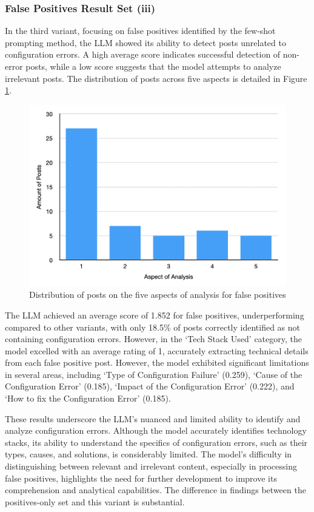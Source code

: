 \documentclass[english,bachelor]{swsLeipzig}
\begin{document}
\subsubsection{False Positives Result Set (iii)}

In the third variant, focusing on false positives identified by the few-shot prompting method, the LLM showed its ability to detect posts unrelated to configuration errors. A high average score indicates successful detection of non-error posts, while a low score suggests that the model attempts to analyze irrelevant posts. The distribution of posts across five aspects is detailed in Figure \ref{fig:appendix5}.

\begin{figure}[h]
  \centering
  \includegraphics[width=1\textwidth]{images/table_setC.png}
  \caption{Distribution of posts on the five aspects of analysis for false positives}
  \label{fig:appendix5}
\end{figure}

The LLM achieved an average score of 1.852 for false positives, underperforming compared to other variants, with only 18.5\% of posts correctly identified as not containing configuration errors. However, in the `Tech Stack Used' category, the model excelled with an average rating of 1, accurately extracting technical details from each false positive post. However, the model exhibited significant limitations in several areas, including `Type of Configuration Failure' (0.259), `Cause of the Configuration Error' (0.185), `Impact of the Configuration Error' (0.222), and `How to fix the Configuration Error' (0.185).

These results underscore the LLM's nuanced and limited ability to identify and analyze configuration errors. Although the model accurately identifies technology stacks, its ability to understand the specifics of configuration errors, such as their types, causes, and solutions, is considerably limited. The model's difficulty in distinguishing between relevant and irrelevant content, especially in processing false positives, highlights the need for further development to improve its comprehension and analytical capabilities. The difference in findings between the positives-only set and this variant is substantial.
\end{document}
